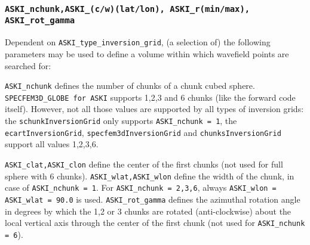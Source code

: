 \documentclass[12pt,a4paper]{article}
\newcommand{\lcode}[1]{\nolinkurl{#1}}
\begin{document}
\subsubsection*{\lcode{ASKI_nchunk,ASKI_(c/w)(lat/lon), ASKI_r(min/max), ASKI_rot_gamma}}
Dependent on \lcode{ASKI_type_inversion_grid}, (a selection of) the following parameters may be used to define a volume 
within which wavefield points are searched for:

\lcode{ASKI_nchunk} defines the number of chunks of a chunk cubed sphere. 
\lcode{SPECFEM3D_GLOBE for ASKI} supports 1,2,3 and 6 chunks (like the forward code itself).
However, not all those values are supported by all types of inversion grids: 
the \lcode{schunkInversionGrid} only supports \lcode{ASKI_nchunk = 1},
the \lcode{ecartInversionGrid}, \lcode{specfem3dInversionGrid} and \lcode{chunksInversionGrid} support 
all values 1,2,3,6.

\lcode{ASKI_clat,ASKI_clon} define the center of the first chunks (not used for full sphere with 6 chunks).
\lcode{ASKI_wlat,ASKI_wlon} define the width of the chunk, in case of \lcode{ASKI_nchunk = 1}. 
For \lcode{ASKI_nchunk = 2,3,6}, always \lcode{ASKI_wlon = ASKI_wlat = 90.0} is used.
\lcode{ASKI_rot_gamma} defines the azimuthal rotation angle in degrees by which the 1,2 or 3 chunks are 
rotated (anti-clockwise) about the local vertical axis through the center of the first chunk (not used 
for \lcode{ASKI_nchunk = 6}).
%


\newpage

%
\end{document}

